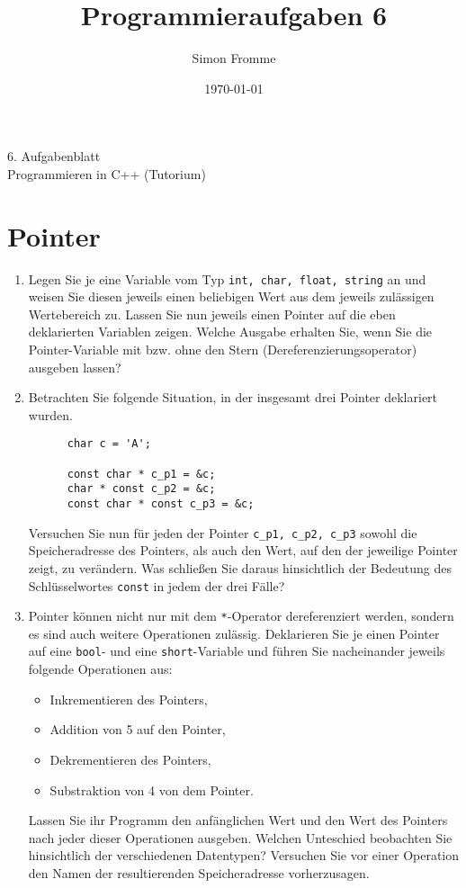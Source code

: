 \documentclass[paper=a4, fontsize=11pt, twoside]{scrartcl}
\title{Programmieraufgaben 6}
\author{Simon Fromme}
\date{\normalsize\today}
\begin{document}
\vspace*{0.75\baselineskip}
\begin{center}
  \Large 6. Aufgabenblatt \\\vspace{0.5em} \large Programmieren in C++ (Tutorium)
\end{center}

\section*{Pointer}
\begin{enumerate}
  \item Legen Sie je eine Variable vom Typ \texttt{int, char, float, string} an und weisen Sie diesen jeweils einen beliebigen Wert aus dem jeweils zulässigen Wertebereich zu. Lassen Sie nun jeweils einen Pointer auf die eben deklarierten Variablen zeigen. Welche Ausgabe erhalten Sie, wenn Sie die Pointer-Variable mit bzw. ohne den Stern (Dereferenzierungsoperator) ausgeben lassen?
  \item 
    Betrachten Sie folgende Situation, in der insgesamt drei Pointer deklariert wurden.
    \begin{verbatim}
      char c = 'A';

      const char * c_p1 = &c;
      char * const c_p2 = &c;
      const char * const c_p3 = &c;
    \end{verbatim}
  Versuchen Sie nun für jeden der Pointer \texttt{c_p1, c_p2, c_p3} sowohl die Speicheradresse des Pointers, als auch den Wert, auf den der jeweilige Pointer zeigt, zu verändern. Was schließen Sie daraus hinsichtlich der Bedeutung des Schlüsselwortes \texttt{const} in jedem der drei Fälle?
  \item Pointer können nicht nur mit dem \texttt{*}-Operator dereferenziert werden, sondern es sind auch weitere Operationen zulässig.
  Deklarieren Sie je einen Pointer auf eine \texttt{bool}- und eine \texttt{short}-Variable und führen Sie nacheinander jeweils folgende Operationen aus:
  \begin{itemize}
    \item Inkrementieren des Pointers,
    \item Addition von 5 auf den Pointer,
    \item Dekrementieren des Pointers,
    \item Substraktion von 4 von dem Pointer.   
  \end{itemize}
Lassen Sie ihr Programm den anfänglichen Wert und den Wert des Pointers nach jeder dieser Operationen ausgeben. Welchen Unteschied beobachten Sie hinsichtlich der verschiedenen Datentypen? Versuchen Sie vor einer Operation den Namen der resultierenden Speicheradresse vorherzusagen. 
\end{enumerate}
\end{document}
